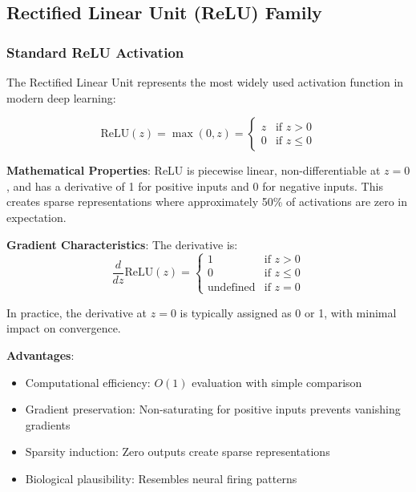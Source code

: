 \documentclass[11pt,a4paper]{report}
\begin{document}
\subsection{Rectified Linear Unit (ReLU) Family}

\subsubsection{Standard ReLU Activation}

The Rectified Linear Unit represents the most widely used activation function in modern deep learning:

\begin{equation}
\text{ReLU}(z) = \max(0, z) = \begin{cases}
z & \text{if } z > 0 \\
0 & \text{if } z \leq 0
\end{cases}
\end{equation}

\textbf{Mathematical Properties}: ReLU is piecewise linear, non-differentiable at $z = 0$, and has a derivative of 1 for positive inputs and 0 for negative inputs. This creates sparse representations where approximately 50\% of activations are zero in expectation.

\textbf{Gradient Characteristics}: The derivative is:
\begin{equation}
\frac{d}{dz}\text{ReLU}(z) = \begin{cases}
1 & \text{if } z > 0 \\
0 & \text{if } z \leq 0 \\
\text{undefined} & \text{if } z = 0
\end{cases}
\end{equation}

In practice, the derivative at $z = 0$ is typically assigned as 0 or 1, with minimal impact on convergence.

\textbf{Advantages}: 
\begin{itemize}
\item Computational efficiency: $O(1)$ evaluation with simple comparison
\item Gradient preservation: Non-saturating for positive inputs prevents vanishing gradients
\item Sparsity induction: Zero outputs create sparse representations
\item Biological plausibility: Resembles neural firing patterns
\end{itemize}
\end{document}
